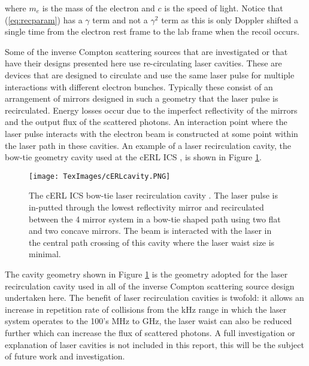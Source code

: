 \documentclass[11pt]{article}
\begin{document}
\noindent where $m_{e}$ is the mass of the electron and $c$ is the speed of light. Notice that (\ref{eq:recparam}) has a $\gamma$ term and not a $\gamma^{2}$ term as this is only Doppler shifted a single time from the electron rest frame to the lab frame when the recoil occurs.

\vspace{5mm}

Some of the inverse Compton scattering sources that are investigated or that have their designs presented here use re-circulating laser cavities. These are devices that are designed to circulate and use the same laser pulse for multiple interactions with different electron bunches. Typically these consist of an arrangement of mirrors designed in such a geometry that the laser pulse is recirculated. Energy losses occur due to the imperfect reflectivity of the mirrors and the output flux of the scattered photons. An interaction point where the laser pulse interacts with the electron beam is constructed at some point within the laser path in these cavities. An example of a laser recirculation cavity, the bow-tie geometry cavity used at the cERL ICS \cite{TAkagicERL}, is shown in Figure \ref{fig:lasercav}.

\begin{figure}[H]
\centering
\texttt{[image: TexImages/cERLcavity.PNG]}
\caption{\label{fig:lasercav} The cERL ICS bow-tie laser recirculation cavity \cite{TAkagicERL}. The laser pulse is in-putted through the lowest reflectivity mirror and recirculated between the 4 mirror system in a bow-tie shaped path using two flat and two concave mirrors. The beam is interacted with the laser in the central path crossing of this cavity where the laser waist size is minimal.}
\end{figure}   

The cavity geometry shown in Figure \ref{fig:lasercav} is the geometry adopted for the laser recirculation cavity used in all of the inverse Compton scattering source design undertaken here. The benefit of laser recirculation cavities is twofold: it allows an increase in repetition rate of collisions from the kHz range in which the laser system operates to the 100's MHz to GHz, the laser waist can also be reduced further which can increase the flux of scattered photons. A full investigation or explanation of laser cavities is not included in this report, this will be the subject of future work and investigation.

\vspace{5mm}
\end{document}
